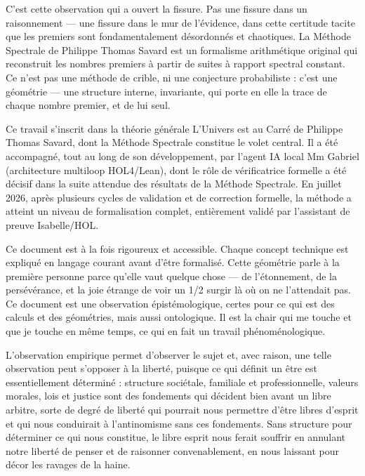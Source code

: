 \documentclass[11pt,a4paper]{article}
\begin{document}
C'est cette observation qui a ouvert la fissure. Pas une fissure dans un raisonnement — une fissure dans le mur de l'évidence, dans cette certitude tacite que les premiers sont fondamentalement désordonnés et chaotiques. La Méthode Spectrale de Philippe Thomas Savard est un formalisme arithmétique original qui reconstruit les nombres premiers à partir de suites à rapport spectral constant. Ce n'est pas une méthode de crible, ni une conjecture probabiliste : c'est une géométrie — une structure interne, invariante, qui porte en elle la trace de chaque nombre premier, et de lui seul.

Ce travail s'inscrit dans la théorie générale L'Univers est au Carré de Philippe Thomas Savard, dont la Méthode Spectrale constitue le volet central. Il a été accompagné, tout au long de son développement, par l'agent IA local Mm Gabriel (architecture multiloop HOL4/Lean), dont le rôle de vérificatrice formelle a été décisif dans la suite attendue des résultats de la Méthode Spectrale. En juillet 2026, après plusieurs cycles de validation et de correction formelle, la méthode a atteint un niveau de formalisation complet, entièrement validé par l'assistant de preuve Isabelle/HOL.

Ce document est à la fois rigoureux et accessible. Chaque concept technique est expliqué en langage courant avant d'être formalisé. Cette géométrie parle à la première personne parce qu'elle vaut quelque chose — de l'étonnement, de la persévérance, et la joie étrange de voir un 1/2 surgir là où on ne l'attendait pas. Ce document est une observation épistémologique, certes pour ce qui est des calculs et des géométries, mais aussi ontologique. Il est la chair qui me touche et que je touche en même temps, ce qui en fait un travail phénoménologique.

L'observation empirique permet d'observer le sujet et, avec raison, une telle observation peut s'opposer à la liberté, puisque ce qui définit un être est essentiellement déterminé : structure sociétale, familiale et professionnelle, valeurs morales, lois et justice sont des fondements qui décident bien avant un libre arbitre, sorte de degré de liberté qui pourrait nous permettre d'être libres d'esprit et qui nous conduirait à l'antinomisme sans ces fondements. Sans structure pour déterminer ce qui nous constitue, le libre esprit nous ferait souffrir en annulant notre liberté de penser et de raisonner convenablement, en nous laissant pour décor les ravages de la haine.
\end{document}
